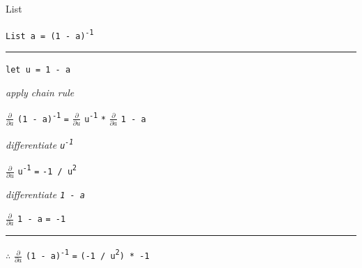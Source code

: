 \begin{frame}{List}

\lstinline{List a = (1 - a)}\textsuperscript{\lstinline{-1}}

\par\noindent\rule{\textwidth}{0.4pt}

\lstinline{let u = 1 - a}

\emph{\tiny{apply chain rule}}

$\frac{\partial}{\partial a}$ {\lstinline{(1 - a)}\textsuperscript{\lstinline{-1}}} \lstinline{=} $\frac{\partial}{\partial u}$ {\lstinline{u}\textsuperscript{\lstinline{-1}}} \lstinline{*} $\frac{\partial}{\partial a}$ \lstinline{1 - a}

\emph{\tiny{differentiate \lstinline{u}\textsuperscript{\lstinline{-1}}}}

$\frac{\partial}{\partial u}$ \lstinline{u}\textsuperscript{\lstinline{-1}} \lstinline{=} \lstinline{-1 / u}\textsuperscript{\lstinline{2}}

\emph{\tiny{differentiate \lstinline{1 - a}}}

$\frac{\partial}{\partial a}$ \lstinline{1 - a} \lstinline{= -1} 

\par\noindent\rule{\textwidth}{0.4pt}

{$\therefore$} $\frac{\partial}{\partial a}$ {\lstinline{(1 - a)}\textsuperscript{\lstinline{-1}}} \lstinline{=} \lstinline{(-1 / u}\textsuperscript{\lstinline{2}}\lstinline{) * -1}

\end{frame}


